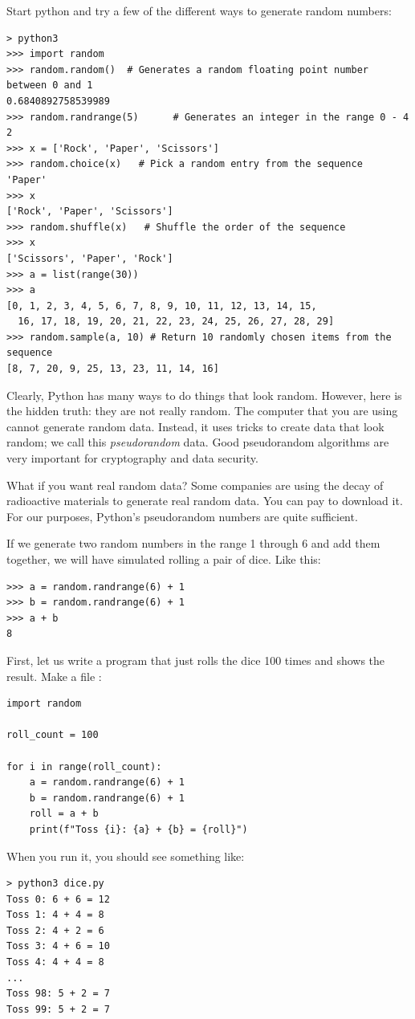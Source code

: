 Start python and try a few of the different ways to generate random numbers:
\begin{verbatim}
> python3
>>> import random
>>> random.random()  # Generates a random floating point number between 0 and 1
0.6840892758539989
>>> random.randrange(5)      # Generates an integer in the range 0 - 4
2
>>> x = ['Rock', 'Paper', 'Scissors']
>>> random.choice(x)   # Pick a random entry from the sequence
'Paper'
>>> x
['Rock', 'Paper', 'Scissors'] 
>>> random.shuffle(x)   # Shuffle the order of the sequence
>>> x
['Scissors', 'Paper', 'Rock']
>>> a = list(range(30))
>>> a
[0, 1, 2, 3, 4, 5, 6, 7, 8, 9, 10, 11, 12, 13, 14, 15,
  16, 17, 18, 19, 20, 21, 22, 23, 24, 25, 26, 27, 28, 29]
>>> random.sample(a, 10) # Return 10 randomly chosen items from the sequence
[8, 7, 20, 9, 25, 13, 23, 11, 14, 16]
\end{verbatim}
Clearly, Python has many ways to do things that look random. However, here is the hidden truth: they are not really
random. The computer that you are using cannot generate random
data. Instead, it uses tricks to create data that look random; we
call this \textit{pseudorandom} data. Good pseudorandom algorithms are
very important for cryptography and data security.

What if you want real random data? Some companies are using
the decay of radioactive materials to generate real random data. You
can pay to download it. For our purposes, Python's pseudorandom
numbers are quite sufficient.

If we generate two random numbers in the range 1 through 6 and add them together, we
will have simulated rolling a pair of dice. Like this:

\begin{verbatim}
>>> a = random.randrange(6) + 1
>>> b = random.randrange(6) + 1
>>> a + b
8
\end{verbatim}

First, let us write a program that just rolls the dice 100 times and shows the result. Make a file :
\begin{verbatim}
import random

roll_count = 100

for i in range(roll_count):
    a = random.randrange(6) + 1
    b = random.randrange(6) + 1
    roll = a + b
    print(f"Toss {i}: {a} + {b} = {roll}")
\end{verbatim}

When you run it, you should see something like:
\begin{verbatim}
> python3 dice.py
Toss 0: 6 + 6 = 12
Toss 1: 4 + 4 = 8
Toss 2: 4 + 2 = 6
Toss 3: 4 + 6 = 10
Toss 4: 4 + 4 = 8
...
Toss 98: 5 + 2 = 7
Toss 99: 5 + 2 = 7
\end{verbatim}

